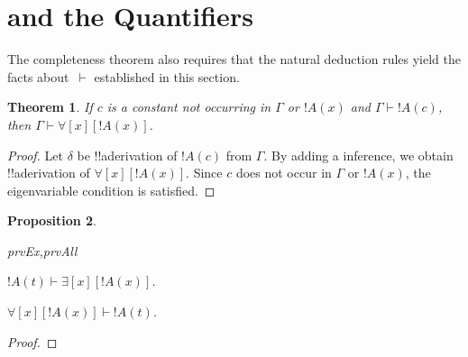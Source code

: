 \documentclass[10pt,a4paper]{article}
\theoremstyle{plain}
\newtheorem{thm}{Theorem}[section]
\newtheorem{prop}[thm]{Proposition}
\theoremstyle{definition}
\theoremstyle{remark}
\newenvironment{explain}{}{}
\newcommand*{\olfileid}[3]{}
\newcommand*{\olsection}[1]{\section*{#1}}
\newcommand*{\ollabel}[1]{\label{#1}}
\providecommand{\AxiomC}[1]{}
\providecommand{\UnaryInfC}[1]{}
\providecommand{\RightLabel}[1]{}
\newenvironment{prooftree}{}{}
\providecommand{\lforall}{\mathord{\forall}}
\providecommand{\lexists}{\mathord{\exists}}
\providecommand{\Proves}{\mathrel{\vdash}}
\providecommand{\tagitem}[1]{\item[#1]}
\providecommand{\Elim}[1]{}
\providecommand{\Intro}[1]{}
\providecommand{\Intro}{\mathrm{I}}
\begin{document}




\olfileid{fol}{ntd}{qpr}

\olsection{ and the Quantifiers}

\begin{explain}
  The completeness theorem also requires that the natural deduction
  rules yield the facts about~$\Proves$ established in this section.
\end{explain}

\begin{thm}
\ollabel{thm:strong-generalization} If $c$ is a constant not occurring
in $\Gamma$ or $!A(x)$ and $\Gamma \Proves !A(c)$, then $\Gamma
\Proves \lforall[x][!A(x)]$.
\end{thm}

\begin{proof}
Let $\delta$ be !!a{derivation} of $!A(c)$ from $\Gamma$.  By adding a
\Intro{\lforall} inference, we obtain !!a{derivation} of
$\lforall[x][!A(x)]$. Since $c$ does not occur in $\Gamma$ or $!A(x)$,
the eigenvariable condition is satisfied.
\end{proof}

\begin{prop}
\ollabel{prop:provability-quantifiers}
\begin{tagenumerate}{prvEx,prvAll}
\tagitem{prvEx}{$!A(t) \Proves \lexists[x][!A(x)]$.}{}

\tagitem{prvAll}{$\lforall[x][!A(x)] \Proves !A(t)$.}{}
\end{tagenumerate}
\end{prop}

\begin{proof}
\end{proof}
\end{document}
